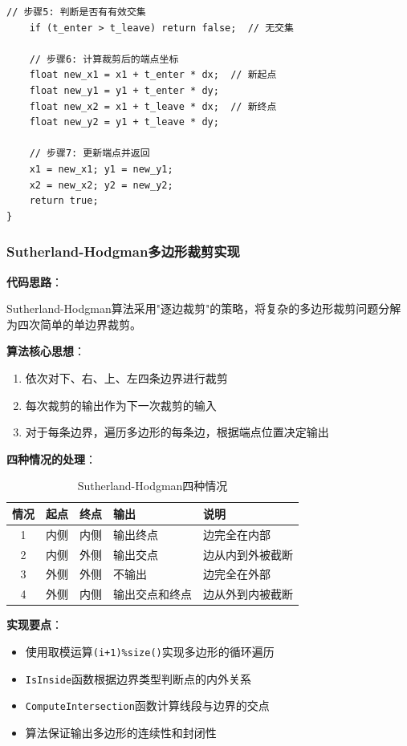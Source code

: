 \documentclass[12pt,a4paper]{article}
\begin{document}
\begin{tcolorbox}
\begin{lstlisting}[caption={Liang-Barsky直线裁剪算法}]
    // 步骤5: 判断是否有有效交集
    if (t_enter > t_leave) return false;  // 无交集
    
    // 步骤6: 计算裁剪后的端点坐标
    float new_x1 = x1 + t_enter * dx;  // 新起点
    float new_y1 = y1 + t_enter * dy;
    float new_x2 = x1 + t_leave * dx;  // 新终点
    float new_y2 = y1 + t_leave * dy;
    
    // 步骤7: 更新端点并返回
    x1 = new_x1; y1 = new_y1;
    x2 = new_x2; y2 = new_y2;
    return true;
}
\end{lstlisting}

\end{tcolorbox}

\begin{tcolorbox}
\subsubsection{Sutherland-Hodgman多边形裁剪实现}

\textbf{代码思路}：

Sutherland-Hodgman算法采用"逐边裁剪"的策略，将复杂的多边形裁剪问题分解为四次简单的单边界裁剪。

\textbf{算法核心思想}：
\begin{enumerate}
    \item 依次对下、右、上、左四条边界进行裁剪
    \item 每次裁剪的输出作为下一次裁剪的输入
    \item 对于每条边界，遍历多边形的每条边，根据端点位置决定输出
\end{enumerate}

\textbf{四种情况的处理}：

\begin{table}[H]
\centering
\begin{tabular}{|c|c|c|l|l|}
\hline
\textbf{情况} & \textbf{起点} & \textbf{终点} & \textbf{输出} & \textbf{说明} \\
\hline
1 & 内侧 & 内侧 & 输出终点 & 边完全在内部 \\
2 & 内侧 & 外侧 & 输出交点 & 边从内到外被截断 \\
3 & 外侧 & 外侧 & 不输出 & 边完全在外部 \\
4 & 外侧 & 内侧 & 输出交点和终点 & 边从外到内被截断 \\
\hline
\end{tabular}
\caption{Sutherland-Hodgman四种情况}
\end{table}

\textbf{实现要点}：
\begin{itemize}
    \item 使用取模运算\texttt{(i+1)\%size()}实现多边形的循环遍历
    \item \texttt{IsInside}函数根据边界类型判断点的内外关系
    \item \texttt{ComputeIntersection}函数计算线段与边界的交点
    \item 算法保证输出多边形的连续性和封闭性
\end{itemize}


\end{tcolorbox}
\end{document}
